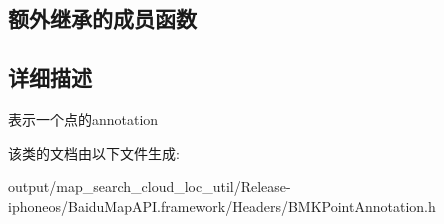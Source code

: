 \subsection*{额外继承的成员函数}


\subsection{详细描述}
表示一个点的annotation 

该类的文档由以下文件生成\+:\begin{DoxyCompactItemize}
\item 
output/map\+\_\+search\+\_\+cloud\+\_\+loc\+\_\+util/\+Release-\/iphoneos/\+Baidu\+Map\+A\+P\+I.\+framework/\+Headers/B\+M\+K\+Point\+Annotation.\+h\end{DoxyCompactItemize}
